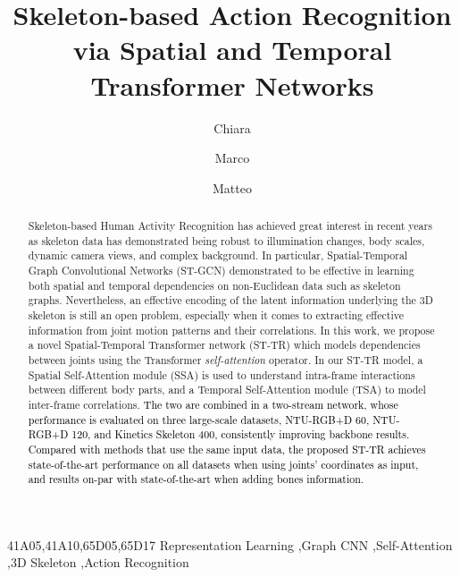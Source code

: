 \documentclass[times,twocolumn,final,authoryear]{elsarticle}
\DeclareRobustCommand{\new}[1]
{{\textcolor{black}{#1}}}
\begin{document}
\ifpreprint
  \setcounter{page}{1}
\else
  \setcounter{page}{1}
\fi

\begin{frontmatter}

\title{Skeleton-based Action Recognition via Spatial and  Temporal Transformer Networks}

\author[1,2]{Chiara } 
\author[1]{Marco }
\author[1]{Matteo }

\address[1]{Politecnico di Milano, Via Giuseppe Ponzio 34/5, Milan 20133, Italy}
\address[2]{Politecnico di Torino, Corso Duca degli Abruzzi, 24, Turin 10129, Italy}



\begin{abstract}
Skeleton-based Human Activity Recognition has achieved great interest in recent years as skeleton data has demonstrated being robust to illumination changes, body scales, dynamic camera views, and complex background. In particular, Spatial-Temporal Graph Convolutional Networks (ST-GCN) demonstrated to be effective in learning both spatial and temporal dependencies on non-Euclidean data such as skeleton graphs. Nevertheless, an effective encoding of the latent information underlying the 3D skeleton is still an open problem, especially when it comes to extracting effective information from joint motion patterns and their correlations. 
In this work, we propose a novel Spatial-Temporal Transformer network (ST-TR) which models dependencies between joints using the Transformer \textit{self-attention} operator. In our ST-TR model, a Spatial Self-Attention module (SSA) is used to understand intra-frame interactions between different body parts, and a Temporal Self-Attention module (TSA) to model inter-frame correlations.
\new{The two are combined in a two-stream network, whose performance is evaluated on three large-scale datasets, NTU-RGB+D 60, NTU-RGB+D 120, and Kinetics Skeleton 400, consistently improving backbone results. Compared with methods that use the same input data, the proposed ST-TR achieves state-of-the-art performance on all datasets when using joints' coordinates as input, and results on-par with state-of-the-art when adding bones information. }



\end{abstract}

\begin{keyword}
\MSC 41A05\sep 41A10\sep 65D05\sep 65D17
\KWD Representation Learning \sep Graph CNN \sep Self-Attention \sep 3D Skeleton \sep Action Recognition

\end{keyword}

\end{frontmatter}
\end{document}
